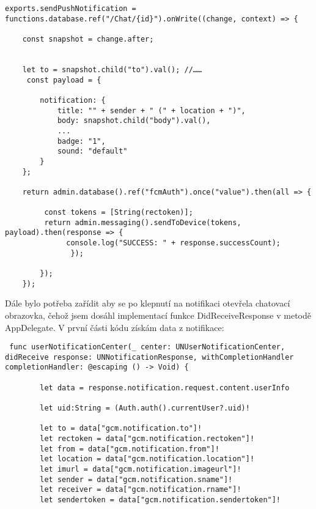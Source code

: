 \documentclass{article}
\begin{document}
\begin{verbatim}
exports.sendPushNotification = functions.database.ref("/Chat/{id}").onWrite((change, context) => {
	
    const snapshot = change.after;


    let to = snapshot.child("to").val(); //……
	 const payload = {
    
		notification: {
			title: "" + sender + " (" + location + ")",
			body: snapshot.child("body").val(),
			...
          	badge: "1",
			sound: "default"
		}
	};
    
	return admin.database().ref("fcmAuth").once("value").then(all => {
        
         const tokens = [String(rectoken)];
  	     return admin.messaging().sendToDevice(tokens, payload).then(response => {
    	      console.log("SUCCESS: " + response.successCount);
      		   });
        
		}); 
	}); 

\end{verbatim}









\vspace{10 mm}
Dále bylo potřeba zařídit aby se po klepnutí na notifikaci otevřela chatovací obrazovka, čehož jsem dosáhl implementací funkce DidReceiveResponse v metodě AppDelegate. V první části kódu získám data z notifikace:

\vspace{10 mm}
\begin{verbatim}
 func userNotificationCenter(_ center: UNUserNotificationCenter, didReceive response: UNNotificationResponse, withCompletionHandler completionHandler: @escaping () -> Void) {
       
        let data = response.notification.request.content.userInfo
        
        let uid:String = (Auth.auth().currentUser?.uid)!
        
        let to = data["gcm.notification.to"]!
        let rectoken = data["gcm.notification.rectoken"]!
        let from = data["gcm.notification.from"]!
        let location = data["gcm.notification.location"]!
        let imurl = data["gcm.notification.imageurl"]!
        let sender = data["gcm.notification.sname"]!
        let receiver = data["gcm.notification.rname"]!
        let sendertoken = data["gcm.notification.sendertoken"]!
        \end{verbatim}
        
\end{document}
